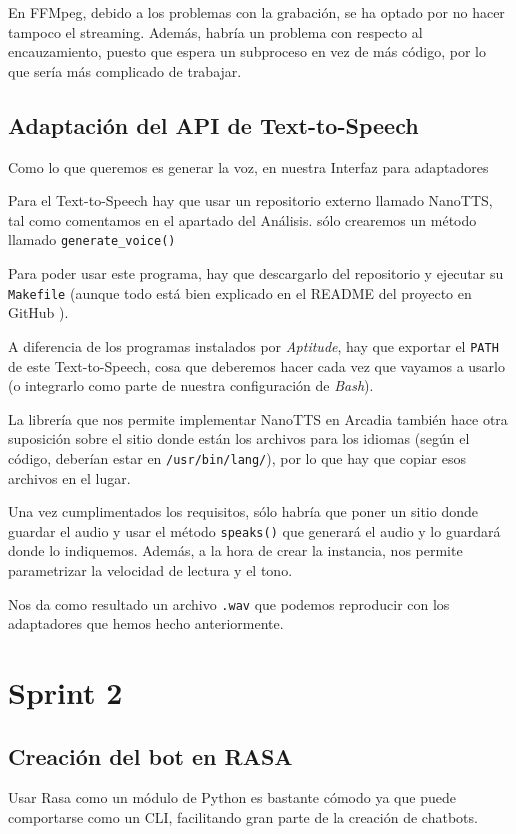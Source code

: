 En FFMpeg, debido a los problemas con la grabación, se ha optado por no hacer tampoco el streaming. Además, habría un problema con respecto al encauzamiento, puesto que espera un subproceso en vez de más código, por lo que sería más complicado de trabajar.

\subsection{Adaptación del API de Text-to-Speech}
Como lo que queremos es generar la voz, en nuestra Interfaz para adaptadores

Para el Text-to-Speech hay que usar un repositorio externo llamado NanoTTS, tal como comentamos en el apartado del Análisis. sólo crearemos un método llamado \texttt{generate\_voice()}

Para poder usar este programa, hay que descargarlo del repositorio y ejecutar su \texttt{Makefile} (aunque todo está bien explicado en el README del proyecto en GitHub \cite{nanotts}).

A diferencia de los programas instalados por \textit{Aptitude}, hay que exportar el \texttt{PATH} de este Text-to-Speech, cosa que deberemos hacer cada vez que vayamos a usarlo (o integrarlo como parte de nuestra configuración de \textit{Bash}).

La librería que nos permite implementar NanoTTS en Arcadia también hace otra suposición sobre el sitio donde están los archivos para los idiomas (según el código, deberían estar en \texttt{/usr/bin/lang/}), por lo que hay que copiar esos archivos en el lugar.

Una vez cumplimentados los requisitos, sólo habría que poner un sitio donde guardar el audio y usar el método \texttt{speaks()} que generará el audio y lo guardará donde lo indiquemos. Además, a la hora de crear la instancia, nos permite parametrizar la velocidad de lectura y el tono.

Nos da como resultado un archivo \texttt{.wav} que podemos reproducir con los adaptadores que hemos hecho anteriormente.


\section{Sprint 2}
\subsection{Creación del bot en RASA}
Usar Rasa \cite{rasa} como un módulo de Python es bastante cómodo ya que puede comportarse como un CLI, facilitando gran parte de la creación de chatbots.

